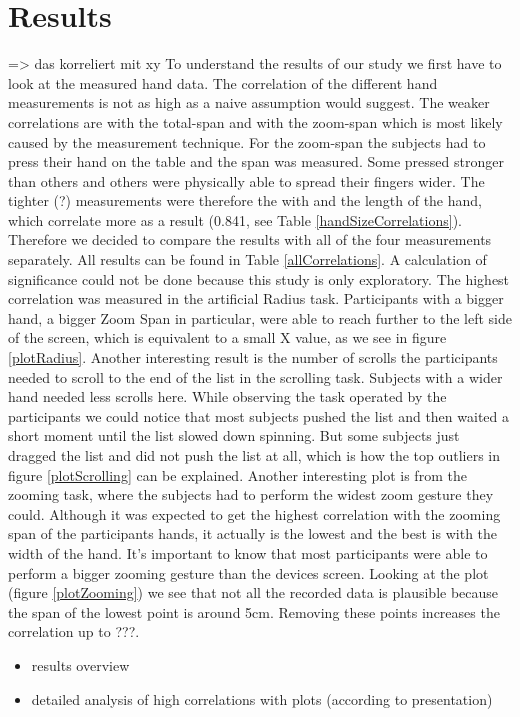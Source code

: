 \documentclass{sigchi}
\begin{document}
\section{Results}
=> das korreliert mit xy
To understand the results of our study we first have to look at the measured hand data. The correlation of the different hand measurements is not as high as a naive assumption would suggest. The weaker correlations are with the total-span and with the zoom-span which is most likely caused by the measurement technique. For the zoom-span the subjects had to press their hand on the table and the span was measured. Some pressed stronger than others and others were physically able to spread their fingers wider. The tighter (?) measurements were therefore the with and the length of the hand, which correlate more as a result (0.841, see Table \ref{handSizeCorrelations}). Therefore we decided to compare the results with all of the four measurements separately. All results can be found in Table \ref{allCorrelations}. A calculation of significance could not be done because this study is only exploratory. The highest correlation was measured in the artificial Radius task. Participants with a bigger hand, a bigger Zoom Span in particular, were able to reach further to the left side of the screen, which is equivalent to a small X value, as we see in figure \ref{plotRadius}.
Another interesting result is the number of scrolls the participants needed to scroll to the end of the list in the scrolling task. Subjects with a wider hand needed less scrolls here. While observing the task operated by the participants we could notice that most subjects pushed the list and then waited a short moment until the list slowed down spinning. But some subjects just dragged the list and did not push the list at all, which is how the top outliers in figure \ref{plotScrolling} can be explained.
Another interesting plot is from the zooming task, where the subjects had to perform the widest zoom gesture they could. Although it was expected to get the highest correlation with the zooming span of the participants hands, it actually is the lowest and the best is with the width of the hand. It's important to know that most participants were able to perform a bigger zooming gesture than the devices screen. Looking at the plot (figure \ref{plotZooming}) we see that not all the recorded data is plausible because the span of the lowest point is around 5cm. Removing these points increases the correlation up to ???.
\begin{itemize}
\item results overview
\item detailed analysis of high correlations with plots (according to presentation)
\end{itemize}
\end{document}

